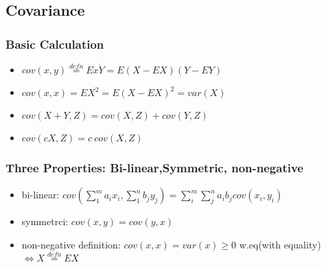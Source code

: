 \documentclass{article}
\theoremstyle{definition}
\theoremstyle{thrm}
\theoremstyle{lma}
\theoremstyle{ppst}
\theoremstyle{crlr}
\begin{document}
\subsection{Covariance}
\subsubsection{Basic Calculation}
\begin{itemize}
	\item $cov(x,y)\stackrel{defn}{=} E\dot{x}\dot{Y} = E(X-EX)(Y-EY)$
	\item $cov(x,x) = EX^2 = E(X-EX)^2 = var(X)$
	\item $cov(X+Y,Z) = cov(X,Z)+cov(Y,Z)$
	\item $cov(cX,Z) = c\ cov(X,Z)$
\end{itemize}
\subsubsection{Three Properties: Bi-linear,Symmetric, non-negative}
\begin{itemize}
	\item bi-linear: $cov(\sum_1^m a_ix_i, \sum_1^n b_jy_j) = \sum_i^m\sum_j^n a_ib_jcov(x_i, y_i)$
	\item symmetrci: $cov(x,y) = cov(y,x)$
	\item non-negative definition: $cov(x,x) = var(x) \geq 0 $ w.eq(with equality) $\iff X\stackrel{defn}{=}EX$
\end{itemize}
\end{document}
